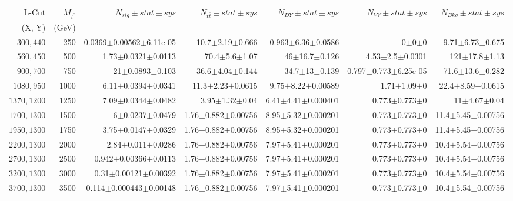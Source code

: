 \documentclass[]{article}
\begin{document}
\begin{table}
\begin{center}
\scriptsize{
\begin{tabular}{ |r|r|r|r|r|r|r|}
\hline 
L-Cut & $M_{l^*}$ & $N_{sig}\pm stat \pm sys $ &$N_{t\bar{t}}\pm stat \pm sys $ & $N_{DY}\pm stat \pm sys $ & $N_{VV}\pm stat \pm sys $ &$N_{Bkg}\pm stat \pm sys$\\
(X, Y) & (GeV) & && &&\\
\hline 
$300, 440$ & 250 & 0.0369$\pm$0.00562$\pm$6.11e-05 & 10.7$\pm$2.19$\pm$0.666 & -0.963$\pm$6.36$\pm$0.0586 & 0$\pm$0$\pm$0 & 9.71$\pm$6.73$\pm$0.675 \\
$560, 450$ & 500 & 1.73$\pm$0.0321$\pm$0.0113 & 70.4$\pm$5.6$\pm$1.07 & 46$\pm$16.7$\pm$0.126 & 4.53$\pm$2.5$\pm$0.0301 & 121$\pm$17.8$\pm$1.13 \\
$900, 700$ & 750 & 21$\pm$0.0893$\pm$0.103 & 36.6$\pm$4.04$\pm$0.144 & 34.7$\pm$13$\pm$0.139 & 0.797$\pm$0.773$\pm$6.25e-05 & 71.6$\pm$13.6$\pm$0.282 \\
$1080,950$ & 1000 & 6.11$\pm$0.0394$\pm$0.0341 & 11.3$\pm$2.23$\pm$0.0615 & 9.75$\pm$8.22$\pm$0.00589 & 1.71$\pm$1.09$\pm$0 & 22.4$\pm$8.59$\pm$0.0615 \\
$1370,1200$ & 1250 & 7.09$\pm$0.0344$\pm$0.0482 & 3.95$\pm$1.32$\pm$0.04 & 6.41$\pm$4.41$\pm$0.000401 & 0.773$\pm$0.773$\pm$0 & 11$\pm$4.67$\pm$0.04 \\
$1700,1300$ & 1500 & 6$\pm$0.0237$\pm$0.0479 & 1.76$\pm$0.882$\pm$0.00756 & 8.95$\pm$5.32$\pm$0.000201 & 0.773$\pm$0.773$\pm$0 & 11.4$\pm$5.45$\pm$0.00756 \\
$1950,1300$ & 1750 & 3.75$\pm$0.0147$\pm$0.0329 & 1.76$\pm$0.882$\pm$0.00756 & 8.95$\pm$5.32$\pm$0.000201 & 0.773$\pm$0.773$\pm$0 & 11.4$\pm$5.45$\pm$0.00756 \\
$2200,1300$ & 2000 & 2.84$\pm$0.011$\pm$0.0286 & 1.76$\pm$0.882$\pm$0.00756 & 7.97$\pm$5.41$\pm$0.000201 & 0.773$\pm$0.773$\pm$0 & 10.4$\pm$5.54$\pm$0.00756 \\
$2700,1300$ & 2500 & 0.942$\pm$0.00366$\pm$0.0113 & 1.76$\pm$0.882$\pm$0.00756 & 7.97$\pm$5.41$\pm$0.000201 & 0.773$\pm$0.773$\pm$0 & 10.4$\pm$5.54$\pm$0.00756 \\
$3200,1300$ & 3000 & 0.31$\pm$0.00121$\pm$0.00392 & 1.76$\pm$0.882$\pm$0.00756 & 7.97$\pm$5.41$\pm$0.000201 & 0.773$\pm$0.773$\pm$0 & 10.4$\pm$5.54$\pm$0.00756 \\
$3700,1300$ & 3500 & 0.114$\pm$0.000443$\pm$0.00148 & 1.76$\pm$0.882$\pm$0.00756 & 7.97$\pm$5.41$\pm$0.000201 & 0.773$\pm$0.773$\pm$0 & 10.4$\pm$5.54$\pm$0.00756 \\

\end{tabular}}
\end{center}
\end{table}
\end{document}
